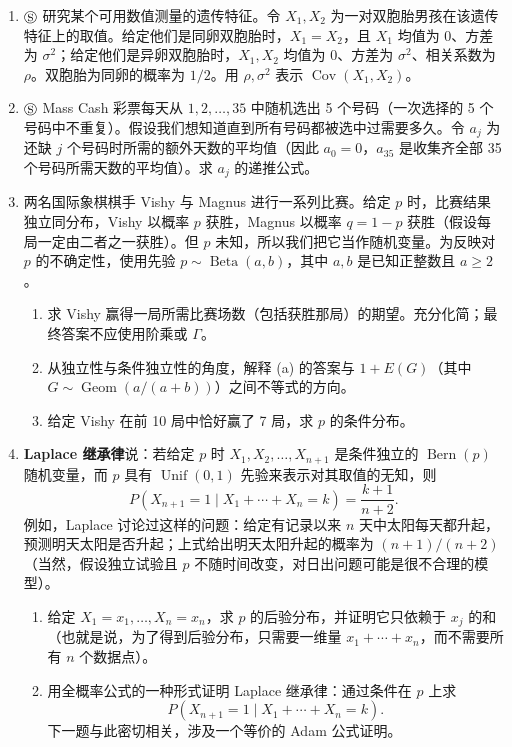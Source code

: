 \documentclass[UTF8,12pt,a4paper,fontset=fandol]{ctexart}
\begin{document}
\begin{enumerate}
  \item $\circledS$ 研究某个可用数值测量的遗传特征。令 $X_1,X_2$ 为一对双胞胎男孩在该遗传特征上的取值。给定他们是同卵双胞胎时，$X_1=X_2$，且 $X_1$ 均值为 $0$、方差为 $\sigma^2$；给定他们是异卵双胞胎时，$X_1,X_2$ 均值为 $0$、方差为 $\sigma^2$、相关系数为 $\rho$。双胞胎为同卵的概率为 $1/2$。用 $\rho,\sigma^2$ 表示 $\operatorname{Cov}(X_1,X_2)$。

  \item $\circledS$ Mass Cash 彩票每天从 $1,2,\ldots,35$ 中随机选出 5 个号码（一次选择的 5 个号码中不重复）。假设我们想知道直到所有号码都被选中过需要多久。令 $a_j$ 为还缺 $j$ 个号码时所需的额外天数的平均值（因此 $a_0=0$，$a_{35}$ 是收集齐全部 35 个号码所需天数的平均值）。求 $a_j$ 的递推公式。

  \item 两名国际象棋棋手 Vishy 与 Magnus 进行一系列比赛。给定 $p$ 时，比赛结果独立同分布，Vishy 以概率 $p$ 获胜，Magnus 以概率 $q=1-p$ 获胜（假设每局一定由二者之一获胜）。但 $p$ 未知，所以我们把它当作随机变量。为反映对 $p$ 的不确定性，使用先验 $p\sim\operatorname{Beta}(a,b)$，其中 $a,b$ 是已知正整数且 $a\ge2$。
  \begin{enumerate}
    \item[(a)] 求 Vishy 赢得一局所需比赛场数（包括获胜那局）的期望。充分化简；最终答案不应使用阶乘或 $\Gamma$。
    \item[(b)] 从独立性与条件独立性的角度，解释 (a) 的答案与 $1+E(G)$（其中 $G\sim\operatorname{Geom}(a/(a+b))$）之间不等式的方向。
    \item[(c)] 给定 Vishy 在前 10 局中恰好赢了 7 局，求 $p$ 的条件分布。
  \end{enumerate}

  \item \textbf{Laplace 继承律}说：若给定 $p$ 时 $X_1,X_2,\ldots,X_{n+1}$ 是条件独立的 $\operatorname{Bern}(p)$ 随机变量，而 $p$ 具有 $\operatorname{Unif}(0,1)$ 先验来表示对其取值的无知，则
  \[
    P(X_{n+1}=1\mid X_1+\cdots+X_n=k)=\frac{k+1}{n+2}.
  \]
  例如，Laplace 讨论过这样的问题：给定有记录以来 $n$ 天中太阳每天都升起，预测明天太阳是否升起；上式给出明天太阳升起的概率为 $(n+1)/(n+2)$（当然，假设独立试验且 $p$ 不随时间改变，对日出问题可能是很不合理的模型）。
  \begin{enumerate}
    \item[(a)] 给定 $X_1=x_1,\ldots,X_n=x_n$，求 $p$ 的后验分布，并证明它只依赖于 $x_j$ 的和（也就是说，为了得到后验分布，只需要一维量 $x_1+\cdots+x_n$，而不需要所有 $n$ 个数据点）。
    \item[(b)] 用全概率公式的一种形式证明 Laplace 继承律：通过条件在 $p$ 上求
    \[
      P(X_{n+1}=1\mid X_1+\cdots+X_n=k).
    \]
    下一题与此密切相关，涉及一个等价的 Adam 公式证明。
  \end{enumerate}


\end{enumerate}
\end{document}
